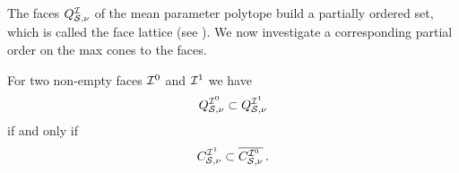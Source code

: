 The faces $Q^{\mathcal{I}}_{\mathcal{S},\nu}$ of the mean parameter polytope build a partially ordered set, which is called the face lattice (see \cite{ziegler_lectures_2013}).
We now investigate a corresponding partial order on the max cones to the faces.

\begin{lemma}
    \label{lem:faceSetsToMaxCones}
    For two non-empty faces $\mathcal{I}^{0}$ and $\mathcal{I}^{1}$ we have %
    \begin{align*}
        Q^{\mathcal{I}^{0}}_{\mathcal{S},\nu} \subset Q^{\mathcal{I}^{1}}_{\mathcal{S},\nu}
    \end{align*}
    if and only if
    \begin{align*}
        C_{\mathcal{S},\nu}^{\mathcal{I}^{1}} \subset \overline{C_{\mathcal{S},\nu}^{\mathcal{I}^{0}}} \, .
    \end{align*}
\end{lemma}

